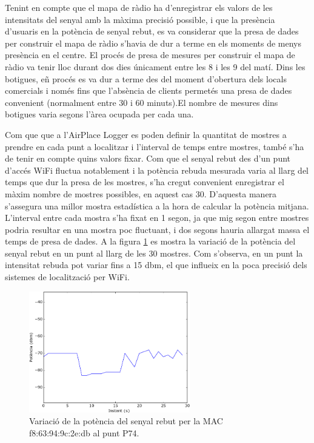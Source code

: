 Tenint en compte que el mapa de ràdio ha d'enregistrar els valors de les intensitats del senyal amb la màxima precisió possible, i que la presència d'usuaris en la potència de senyal rebut, es va considerar que la presa de dades per construir el mapa de ràdio s'havia de dur a terme en els moments de menys presència en el centre. El procés de presa de mesures per construir el mapa de ràdio va tenir lloc durant dos dies únicament entre les 8 i les 9 del matí. Dins les botigues, eñ procés es va dur a terme des del moment d'obertura dels locals comercials i només fins que l'absència de clients permetés una presa de dades convenient (normalment entre 30 i 60 minuts).El nombre de mesures dins botigues varia segons l'àrea ocupada per cada una.

Com que que a l'AirPlace Logger es poden definir la quantitat de mostres a prendre en cada punt a localitzar i l'interval de temps entre mostres, també s'ha de tenir en compte quins valors fixar. Com que el senyal rebut des d'un punt d'accés WiFi fluctua notablement i la potència rebuda mesurada varia al llarg del temps que dur la presa de les mostres, s'ha cregut convenient enregistrar el màxim nombre de mostres possibles, en aquest cas 30. D'aquesta manera s'assegura una millor mostra estadística a la hora de calcular la potència mitjana. L'interval entre cada mostra s'ha fixat en 1 segon, ja que mig segon entre mostres podria resultar en una mostra poc fluctuant, i dos segons hauria allargat massa el temps de presa de dades. A la figura \ref{fig:fluctuacio} es mostra la variació de la potència del senyal rebut en un punt al llarg de les 30 mostres. Com s'observa, en un punt la intensitat rebuda pot variar fins a 15 dbm, el que influeix en la poca precisió dels sistemes de localització per WiFi.

\begin{figure}[ht]
\begin{center}
\includegraphics[width=7cm]{imatges/fluctuacio.png}
\caption{Variació de la potència del senyal rebut per la MAC f8:63:94:9c:2e:db al punt P74.}
\label{fig:fluctuacio}
\end{center}
\end{figure}
